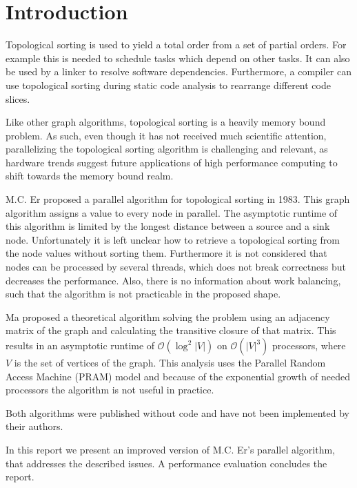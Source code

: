 \section{Introduction}\label{sec:intro}

Topological sorting is used to yield a total order from a set of partial orders. For example this is needed to schedule tasks which depend on other tasks. It can also be used by a linker to resolve software dependencies. Furthermore, a compiler can use topological sorting during static code analysis to rearrange different code slices.

Like other graph algorithms, topological sorting is a heavily memory bound problem. As such, even though it has not received much scientific attention, parallelizing the topological sorting algorithm is challenging and relevant, as hardware trends suggest future applications of high performance computing to shift towards the memory bound realm.


M.C. Er \cite{er1983parallel} proposed a parallel algorithm for topological sorting in 1983. This graph algorithm assigns a value to every node in parallel. The asymptotic runtime of this algorithm is limited by the longest distance between a source and a sink node. Unfortunately it is left unclear how to retrieve a topological sorting from the node values without sorting them. Furthermore it is not considered that nodes can be processed by several threads, which does not break correctness but decreases the performance. Also, there is no information about work balancing, such that the algorithm is not practicable in the proposed shape.

Ma \cite{ma1997efficient} proposed a theoretical algorithm solving the problem using an adjacency matrix of the graph and calculating the transitive closure of that matrix. This results in an asymptotic runtime  of $\mathcal{O}(\log^2 |V|)$ on $\mathcal{O}(|V|^3)$ processors, where $V$ is the set of vertices of the graph. This analysis uses the Parallel Random Access Machine (PRAM) model and because of the exponential growth of needed processors the algorithm is not useful in practice.

Both algorithms were published without code and have not been implemented by their authors.

In this report we present an improved version of M.C. Er's parallel algorithm, that addresses the described issues. A performance evaluation concludes the report.


